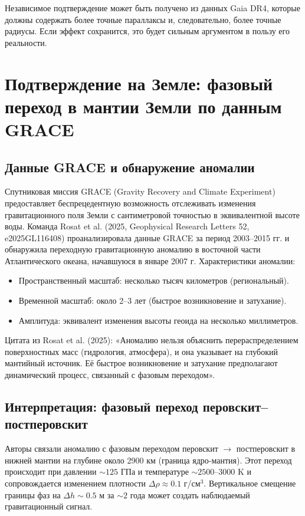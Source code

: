 \documentclass[12pt]{article}
\theoremstyle{remark}
\begin{document}
	Независимое подтверждение может быть получено из данных Gaia DR4, которые должны содержать более точные параллаксы и, следовательно, более точные радиусы. Если эффект сохранится, это будет сильным аргументом в пользу его реальности.
	
	\section{Подтверждение на Земле: фазовый переход в мантии Земли по данным GRACE}
	\label{sec:grace}
	
	\subsection{Данные GRACE и обнаружение аномалии}
	\label{subsec:grace-data}
	
	Спутниковая миссия GRACE (Gravity Recovery and Climate Experiment) предоставляет беспрецедентную возможность отслеживать изменения гравитационного поля Земли с сантиметровой точностью в эквивалентной высоте воды. Команда Rosat et al. (2025, Geophysical Research Letters 52, e2025GL116408) проанализировала данные GRACE за период 2003–2015 гг. и обнаружила переходную гравитационную аномалию в восточной части Атлантического океана, начавшуюся в январе 2007 г. Характеристики аномалии:
	\begin{itemize}
		\item Пространственный масштаб: несколько тысяч километров (региональный).
		\item Временной масштаб: около 2–3 лет (быстрое возникновение и затухание).
		\item Амплитуда: эквивалент изменения высоты геоида на несколько миллиметров.
	\end{itemize}
	Цитата из Rosat et al. (2025): «Аномалию нельзя объяснить перераспределением поверхностных масс (гидрология, атмосфера), и она указывает на глубокий мантийный источник. Её быстрое возникновение и затухание предполагают динамический процесс, связанный с фазовым переходом».
	
	\subsection{Интерпретация: фазовый переход перовскит–постперовскит}
	\label{subsec:grace-interpretation}
	
	Авторы связали аномалию с фазовым переходом перовскит $\rightarrow$ постперовскит в нижней мантии на глубине около 2900 км (граница ядро-мантия). Этот переход происходит при давлении $\sim 125$ ГПа и температуре $\sim 2500$–$3000$ K и сопровождается изменением плотности $\Delta\rho \approx 0.1$ г/см$^3$. Вертикальное смещение границы фаз на $\Delta h \sim 0.5$ м за $\sim 2$ года может создать наблюдаемый гравитационный сигнал.
	
\end{document}

